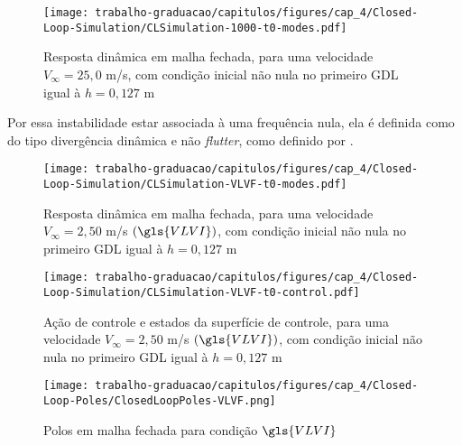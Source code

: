 \begin{figure}[ht]
    \centering
    \caption{Resposta dinâmica em malha fechada, para uma velocidade $V_{\infty} = 25,0$ m/s, com condição inicial não nula no primeiro \gls{GDL} igual à $h=0,127$ m}
    \noindent\texttt{[image: trabalho-graduacao/capitulos/figures/cap\_4/Closed-Loop-Simulation/CLSimulation-1000-t0-modes.pdf]}
    \label{fig:CloseLoopResponse-t0-1000}
\end{figure}

Por essa instabilidade estar associada à uma frequência nula, ela é definida como do tipo divergência dinâmica e não \textit{flutter}, como definido por \textcite{book:Wright-Cooper}.

\begin{figure}[ht]
    \centering
    \caption{Resposta dinâmica em malha fechada, para uma velocidade $V_{\infty} = 2,50$ m/s $(\gls{VLVI})$, com condição inicial não nula no primeiro \gls{GDL} igual à $h=0,127$ m}
    \noindent\texttt{[image: trabalho-graduacao/capitulos/figures/cap\_4/Closed-Loop-Simulation/CLSimulation-VLVF-t0-modes.pdf]}
    \label{fig:CloseLoopResponse-t0-VLVF}
\end{figure}

\begin{figure}[ht]
    \centering
    \caption{Ação de controle e estados da superfície de controle, para uma velocidade $V_{\infty} = 2,50$ m/s $(\gls{VLVI})$, com condição inicial não nula no primeiro \gls{GDL} igual à $h=0,127$ m}
    \noindent\texttt{[image: trabalho-graduacao/capitulos/figures/cap\_4/Closed-Loop-Simulation/CLSimulation-VLVF-t0-control.pdf]}
    \label{fig:CloseLoopControl-t0-VLVF}
\end{figure}

\begin{figure}[ht]
    \centering
    \caption{Polos em malha fechada para condição $\gls{VLVI}$}
    \noindent\texttt{[image: trabalho-graduacao/capitulos/figures/cap\_4/Closed-Loop-Poles/ClosedLoopPoles-VLVF.png]}
    \label{fig:CloseLoopPoles}
\end{figure}
